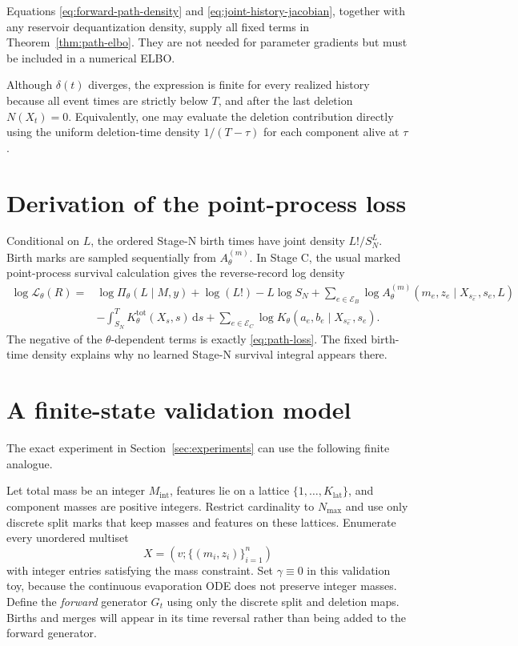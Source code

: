\documentclass[10pt]{article}
\theoremstyle{definition}
\theoremstyle{remark}
\newcommand{\dd}{\,\mathrm{d}}
\begin{document}
Equations \eqref{eq:forward-path-density} and
\eqref{eq:joint-history-jacobian}, together with any reservoir
dequantization density, supply all fixed terms in
Theorem~\ref{thm:path-elbo}.  They are not needed for parameter gradients but
must be included in a numerical ELBO.

Although $\delta(t)$ diverges, the expression is finite for every realized history because all event times are strictly below $T$, and after the last deletion $N(X_t)=0$.  Equivalently, one may evaluate the deletion contribution directly using the uniform deletion-time density $1/(T-\tau)$ for each component alive at $\tau$.

\section{Derivation of the point-process loss}
\label{app:loss-derivation}

Conditional on $L$, the ordered Stage-N birth times have joint density
$L!/S_N^L$.  Birth marks are sampled sequentially from
$A_\theta^{(m)}$.  In
Stage C, the usual marked point-process survival calculation gives the
reverse-record log density
\begin{align}
  \log\mathcal L_\theta(R)
  ={}&\log\Pi_\theta(L\mid M,y)
  +\log(L!)-L\log S_N
  +\sum_{e\in\mathcal E_B}
    \log A_\theta^{(m)}(m_e,z_e\mid X_{s_e^-},s_e,L)
  \nonumber\\
  &-\int_{S_N}^{T}K_\theta^{\mathrm{tot}}(X_s,s)\dd s
  +\sum_{e\in\mathcal E_C}
    \log K_\theta(a_e,b_e\mid X_{s_e^-},s_e).
  \label{eq:reverse-record-density}
\end{align}
The negative of the $\theta$-dependent terms is exactly
\eqref{eq:path-loss}.  The fixed birth-time density explains why no learned
Stage-N survival integral appears there.

\section{A finite-state validation model}
\label{app:finite-validation}

The exact experiment in Section~\ref{sec:experiments} can use the following finite analogue.

Let total mass be an integer $M_{\mathrm{int}}$, features lie on a lattice
$\{1,\ldots,K_{\mathrm{lat}}\}$, and component masses are positive
integers.  Restrict cardinality to $N_{\max}$ and use only discrete split
marks that keep masses and features on these lattices.  Enumerate every
unordered multiset
\begin{equation}
  X=\left(v;\{(m_i,z_i)\}_{i=1}^{n}\right)
\end{equation}
with integer entries satisfying the mass constraint.  Set $\gamma\equiv0$
in this validation toy, because the continuous evaporation ODE does not
preserve integer masses.  Define the \emph{forward} generator $G_t$ using
only the discrete split and deletion maps.  Births and merges will appear in
its time reversal rather than being added to the forward generator.
\end{document}

